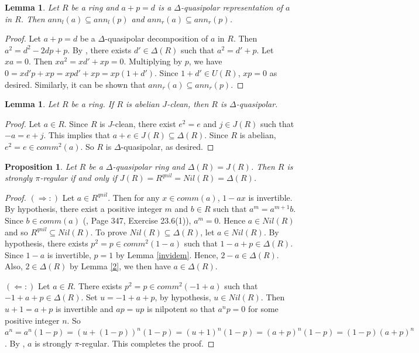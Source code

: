 \documentclass[12pt, reqno]{amsart}
\newtheorem{lem}[thm]{Lemma}
\newtheorem{prop}[thm]{Proposition}
\numberwithin{equation}{section}
\begin{document}
   \begin{lem}\label{ann}
    Let $R$ be a ring and $a+p=d$ is a $\Delta$-quasipolar representation of $a$ in $R$. Then $ann_l(a)\subseteq ann_l(p)$ and $ann_r(a)\subseteq ann_r(p)$.
\end{lem}

\begin{proof}
    Let $a+p=d$ be a $\Delta$-quasipolar decomposition of $a$ in $R$. Then $a^2=d^2-2dp+p$. By \cite[Lemma 2.6]{Danchev}, there exists $d'\in \Delta(R)$ such that $a^2=d'+p$. Let $xa=0$. Then $xa^2=xd'+xp=0$. Multiplying by $p$, we have $0=xd'p+xp=xpd'+xp=xp(1+d')$. Since $1+d'\in U(R)$, $xp=0$ as desired. Similarly, it can be shown that $ann_r(a)\subseteq ann_r(p)$.
\end{proof}


\begin{lem}
    Let $R$ be a ring. If $R$ is abelian $J$-clean, then $R$ is $\Delta$-quasipolar.
\end{lem}

\begin{proof}
 Let $a\in R$. Since $R$ is $J$-clean, there exist $e^2=e$ and $j\in J(R)$ such that $-a=e+j$. This implies that $a+e\in J(R) \subseteq \Delta(R)$. Since $R$ is abelian, $e^2=e\in comm^2(a)$. So $R$ is $\Delta$-quasipolar, as desired.
\end{proof}



\begin{prop}
    Let $R$ be a $\Delta$-quasipolar ring and $\Delta(R)=J(R)$. Then $R$ is strongly $\pi$-regular if and only if $J(R)=R^{qnil}=Nil(R)=\Delta(R)$.
\end{prop}

\begin{proof}
    
$(\Rightarrow:)$ Let $a \in R^{qnil}$. Then for any $x \in comm(a)$, $1 - ax$ is invertible. By hypothesis, there exist a positive integer $m$ and $b \in R$ such that $a^m = a^{m+1}b$. Since $b \in comm(a)$ (\cite{Lam}, Page 347, Exercise 23.6(1)), $a^m = 0$. Hence $a \in Nil(R)$ and so $R^{qnil} \subseteq Nil(R)$. To prove $Nil(R) \subseteq \Delta(R)$, let $a \in Nil(R)$. By hypothesis, there exists $p^2 = p \in comm^2(1 - a)$ such that $1 - a + p \in \Delta(R)$. Since $1 - a$ is invertible, $p = 1$ by Lemma \ref{invidem}. Hence, $2 - a \in \Delta(R)$. Also, $2 \in \Delta(R)$ by Lemma \ref{2}, we then have $a \in \Delta(R)$.

$(\Leftarrow:)$ Let $a \in R$. There exists $p^2 = p \in comm^2(-1 + a)$ such that $-1 + a + p \in \Delta(R)$. Set $u = -1 + a + p $, by hypothesis, $u\in Nil(R)$. Then $u+1=a + p$ is invertible and $ap = up$ is nilpotent so that $a^n p = 0$ for some positive integer $n$. So $a^n = a^n(1 - p) = (u + (1 - p))^n(1 - p) = (u + 1)^n(1 - p) = (a + p)^n(1 - p) = (1 - p)(a + p)^n$. By \cite[Proposition 1]{Nicholson}, $a$ is strongly $\pi$-regular. This completes the proof. 
\end{proof}
\end{document}
